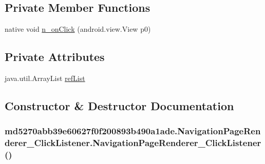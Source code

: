 \subsection*{Private Member Functions}
\begin{CompactItemize}
\item 
native void \hyperlink{classmd5270abb39e60627f0f200893b490a1ade_1_1_navigation_page_renderer___click_listener_2f51757e71533b23f62f4a8e52107fc7}{n\_\-onClick} (android.view.View p0)
\end{CompactItemize}
\subsection*{Private Attributes}
\begin{CompactItemize}
\item 
java.util.ArrayList \hyperlink{classmd5270abb39e60627f0f200893b490a1ade_1_1_navigation_page_renderer___click_listener_e4c5e1d7ccffa05c15b8ae87fdcccc50}{refList}
\end{CompactItemize}


\subsection{Constructor \& Destructor Documentation}
\hypertarget{classmd5270abb39e60627f0f200893b490a1ade_1_1_navigation_page_renderer___click_listener_1b32e78e871f3091302ec3e46bf69476}{
\subsubsection[{NavigationPageRenderer\_\-ClickListener}]{\setlength{\rightskip}{0pt plus 5cm}md5270abb39e60627f0f200893b490a1ade.NavigationPageRenderer\_\-ClickListener.NavigationPageRenderer\_\-ClickListener ()}}
\label{classmd5270abb39e60627f0f200893b490a1ade_1_1_navigation_page_renderer___click_listener_1b32e78e871f3091302ec3e46bf69476}




